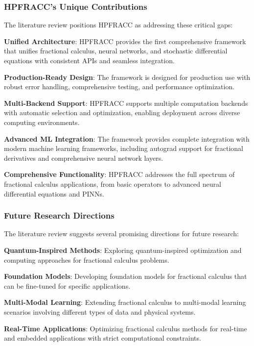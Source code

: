 \subsubsection{HPFRACC's Unique Contributions}

The literature review positions HPFRACC as addressing these critical gaps:

\textbf{Unified Architecture}: HPFRACC provides the first comprehensive framework that unifies fractional calculus, neural networks, and stochastic differential equations with consistent APIs and seamless integration.

\textbf{Production-Ready Design}: The framework is designed for production use with robust error handling, comprehensive testing, and performance optimization.

\textbf{Multi-Backend Support}: HPFRACC supports multiple computation backends with automatic selection and optimization, enabling deployment across diverse computing environments.

\textbf{Advanced ML Integration}: The framework provides complete integration with modern machine learning frameworks, including autograd support for fractional derivatives and comprehensive neural network layers.

\textbf{Comprehensive Functionality}: HPFRACC addresses the full spectrum of fractional calculus applications, from basic operators to advanced neural differential equations and PINNs.

\subsubsection{Future Research Directions}

The literature review suggests several promising directions for future research:

\textbf{Quantum-Inspired Methods}: Exploring quantum-inspired optimization and computing approaches for fractional calculus problems.

\textbf{Foundation Models}: Developing foundation models for fractional calculus that can be fine-tuned for specific applications.

\textbf{Multi-Modal Learning}: Extending fractional calculus to multi-modal learning scenarios involving different types of data and physical systems.

\textbf{Real-Time Applications}: Optimizing fractional calculus methods for real-time and embedded applications with strict computational constraints.

